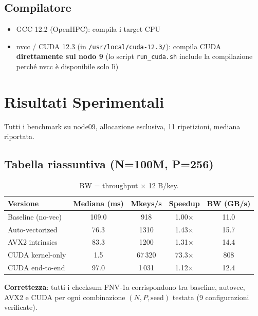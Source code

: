 \documentclass[11pt,a4paper]{article}
\begin{document}
\subsection{Compilatore}
\begin{itemize}
    \item GCC 12.2 (OpenHPC): compila i target CPU
    \item nvcc / CUDA 12.3 (in \texttt{/usr/local/cuda-12.3/}): compila CUDA \textbf{direttamente sul nodo 9} (lo script \texttt{run\_cuda.sh} include la compilazione perché nvcc è disponibile solo lì)
\end{itemize}


\section{Risultati Sperimentali}
\label{sec:risultati}

Tutti i benchmark su node09, allocazione esclusiva, 11 ripetizioni, mediana riportata.

\subsection{Tabella riassuntiva (N=100M, P=256)}

\begin{table}[h]
\centering
\begin{tabular}{@{}lcccc@{}}
\toprule
\textbf{Versione} & \textbf{Mediana (ms)} & \textbf{Mkeys/s} & \textbf{Speedup} & \textbf{BW (GB/s)} \\
\midrule
Baseline (no-vec) & 109.0 & 918 & 1.00$\times$ & 11.0 \\
Auto-vectorized   &  76.3 & 1310 & 1.43$\times$ & 15.7 \\
AVX2 intrinsics   &  83.3 & 1200 & 1.31$\times$ & 14.4 \\
\midrule
CUDA kernel-only  &   1.5 & 67\,320 & 73.3$\times$ & 808 \\
CUDA end-to-end   &  97.0 & 1\,031 & 1.12$\times$ & 12.4 \\
\bottomrule
\end{tabular}
\caption{BW = throughput $\times$ 12 B/key.}
\end{table}

\textbf{Correttezza}: tutti i checksum FNV-1a corrispondono tra baseline, autovec, AVX2 e CUDA per ogni combinazione $(N, P, \text{seed})$ testata (9 configurazioni verificate).
\end{document}
